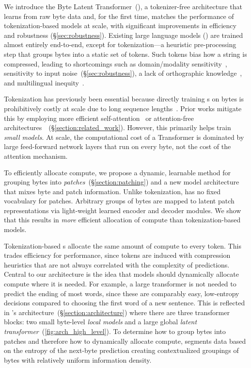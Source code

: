 \documentclass[]{fairmeta}
\begin{document}
We introduce the Byte Latent Transformer~(\modelbf{}), a tokenizer-free architecture that learns from raw byte data and, for the first time, matches the performance of tokenization-based models at scale, with significant improvements in efficiency and robustness (\S\ref{sec:robustness}).
Existing large language models (\llms{}) are trained almost entirely end-to-end, except for tokenization---a heuristic pre-processing step that groups bytes into a static set of tokens.
Such tokens bias how a string is compressed, leading to shortcomings such as domain/modality sensitivity~\citep{dagangetting}, sensitivity to input noise~(\S\ref{sec:robustness}), a lack of orthographic knowledge~\citep{edman2024cute}, and multilingual inequity~\citep{liang2023xlm,petrov2024language,limisiewicz2024myte}. 

Tokenization has previously been essential because directly training \llm{}s on bytes is prohibitively costly at scale due to long sequence lengths~\citep{xue2022byt5}.
Prior works mitigate this by employing more efficient self-attention~\citep{el2020characterbert, clark2022canine} or attention-free architectures~\citep{wang2024mambabyte}~(\S\ref{section:related_work}). However, this primarily helps train \textit{small models}.
At scale, the computational cost of a Transformer is dominated by large feed-forward network layers that run on every byte, not the cost of the attention mechanism.

To efficiently allocate compute, we propose a dynamic, learnable method for grouping bytes into \textit{patches}~(\S\ref{section:patching}) and a new model architecture that mixes byte and patch information.
Unlike tokenization, \model{} has no fixed vocabulary for patches.
Arbitrary groups of bytes are mapped to latent patch representations via light-weight learned encoder and decoder modules.
We show that this results in \textit{more} efficient allocation of compute than tokenization-based models.

Tokenization-based \llm{}s allocate the same amount of compute to every token. This trades efficiency for performance, since tokens are induced with compression heuristics that are not always correlated with the complexity of predictions. Central to our architecture is the idea that models should dynamically allocate compute where it is needed. For example, a large transformer is not needed to predict the ending of most words, since these are comparably easy, low-entropy decisions compared to choosing the first word of a new sentence.
This is reflected in \model{}'s architecture~(\S\ref{section:architecture}) where there are three transformer blocks: two small byte-level \textit{local models} and a large global \textit{latent transformer}~(\autoref{fig:arch_high_level}).
To determine how to group bytes into patches and therefore how to dynamically allocate compute, \model{}
segments data based on the entropy of the next-byte prediction creating contextualized groupings of bytes with relatively uniform information density.
\end{document}
